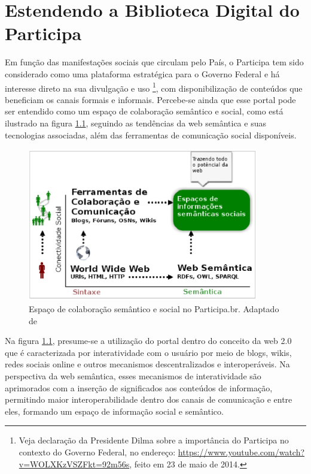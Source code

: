 \chapter{Estendendo a Biblioteca Digital do Participa}
\label{cap:extbibparticipa}

Em função das manifestações sociais que circulam pelo País, o Participa tem sido considerado como uma plataforma estratégica para o Governo Federal e há interesse direto na sua divulgação e uso \footnote{Veja declaração da Presidente Dilma sobre a importância do Participa no contexto do Governo Federal, no endereço: \url{https://www.youtube.com/watch?v=WOLXKzVSZFkt=92m56s}, feito em 23 de maio de 2014.}, com disponibilização de conteúdos que beneficiam os canais formais e informais. Percebe-se ainda que esse portal pode ser entendido como um espaço de colaboração semântico e  social, como está ilustrado na figura \ref{fig:semanticoparticipa}, seguindo as tendências da web semântica e suas tecnologias associadas, além das ferramentas de comunicação social disponíveis.

\graphicspath{{figuras/}}
\begin{figure}[H]
\centering
\includegraphics[width=0.9\textwidth]{semantico_participa}
\caption[Espaço de colaboração semântico e social no Participa.br]{Espaço de colaboração semântico e social no Participa.br. Adaptado de \cite{kruk2006libraries}}
\label{fig:semanticoparticipa}
\end{figure}

Na figura \ref{fig:semanticoparticipa}, presume-se a utilização do portal dentro do conceito da web 2.0 que é caracterizada por interatividade com o usuário por meio de blogs, wikis, redes sociais online e outros mecanismos descentralizados e interoperáveis. Na perspectiva da web semântica, esses mecanismos de interatividade são aprimorados com a inserção de significados aos conteúdos de informação, permitindo maior interoperabilidade dentro dos canais de comunicação e entre eles, formando um espaço de informação social e semântico.

